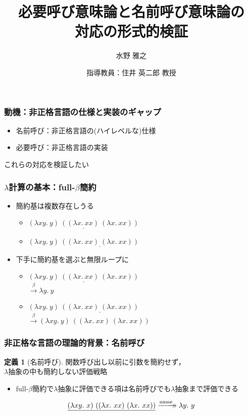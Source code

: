\documentclass[dvipdfmx,cjk,xcolor=dvipsnames,envcountsect,notheorems,12pt]{beamer}
\title{必要呼び意味論と名前呼び意味論の\\対応の形式的検証}
\author{水野 雅之}
\institute[東北大学 住井・松田研]{情報科学研究科 情報基礎科学専攻\\住井・松田研究室}%
\date{指導教員：住井 英二郎 教授}
\theoremstyle{definition}
\newtheorem{definition}{定義}
\newcommand{\xtwoheadrightarrow}[2][]{%
  \xrightarrow[#1]{#2}\mathrel{\mkern-14mu}\rightarrow
}
\newcommand{\FULLBETA}{\xrightarrow{\beta}}
\newcommand{\RTCLOSCALLBYNAME}{\xtwoheadrightarrow{\mathrm{name}}}
\begin{document}
\frame[plain]{\titlepage}%

\begin{frame}
	\frametitle{動機：非正格言語の仕様と実装のギャップ}
	\begin{itemize}
		\item 名前呼び：非正格言語の(ハイレベルな)仕様
		\item 必要呼び：非正格言語の実装
	\end{itemize}
	\vfill
	\begin{center}
		\Large
		これらの対応を検証したい
	\end{center}
\end{frame}

\begin{frame}
	\frametitle{$\lambda$計算の基本：full-$\beta$簡約}
	\begin{itemize}
		\item 簡約基は複数存在しうる
			\begin{itemize}
				\item $\underline{(\lambda xy.~y)~((\lambda x.~xx)~(\lambda x.~xx))}$
				\item $(\lambda xy.~y)~\underline{((\lambda x.~xx)~(\lambda x.~xx))}$
			\end{itemize}
		\item 下手に簡約基を選ぶと無限ループに
			\begin{itemize}
				\item 
					$\underline{(\lambda xy.~y)~((\lambda x.~xx)~(\lambda x.~xx))}$ \\
					$\FULLBETA \lambda y.~y$
				\item 
					$(\lambda xy.~y)~\underline{((\lambda x.~xx)~(\lambda x.~xx))}$ \\
					$\FULLBETA (\lambda xy.~y)~((\lambda x.~xx)~(\lambda x.~xx))$
			\end{itemize}
	\end{itemize}
\end{frame}

\begin{frame}
	\frametitle{非正格な言語の理論的背景：名前呼び}
	\begin{definition}[名前呼び]
		\Large 関数呼び出し以前に引数を簡約せず，\\$\lambda$抽象の中も簡約しない評価戦略
	\end{definition}
	\begin{itemize}
		\item full-$\beta$簡約で$\lambda$抽象に評価できる項は名前呼びでも$\lambda$抽象まで評価できる\\
	\end{itemize}
	\large \[\underline{(\lambda xy.~x)~((\lambda x.~xx)~(\lambda x.~xx))} \RTCLOSCALLBYNAME \lambda y.~y\]
\end{frame}
\end{document}
